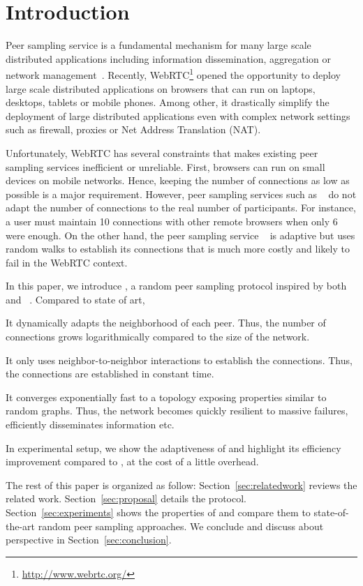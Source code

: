 
\section{Introduction}

Peer sampling service is a fundamental mechanism for many large scale
distributed applications including information dissemination, aggregation
 or network management~\cite{jelasity2007gossip}. Recently,
WebRTC\footnote{\url{http://www.webrtc.org/}} opened the opportunity to deploy large scale distributed
applications on browsers that can run on laptops, desktops, tablets or mobile
phones. Among other, it drastically simplify the deployment of large
distributed applications even with complex network settings such as firewall,
proxies or Net Address Translation (NAT).

Unfortunately, WebRTC has several constraints that makes existing peer
sampling services inefficient or unreliable. First, browsers can run
on small devices on mobile networks. Hence, keeping the number of
connections as low as possible is a major requirement. However, peer
sampling services such as \CYCLON{}~\cite{ voulgaris2005cyclon} do not
adapt the number of connections to the real number of
participants. For instance, a user must maintain 10 connections with
other remote browsers when only 6 were enough. On the other hand, the
peer sampling service \SCAMP{}~\cite{ganesh2003peer} is adaptive but
uses random walks to establish its connections that is much more
costly and likely to fail in the WebRTC context.

In this paper, we introduce \SCAMPLON{}, a random peer sampling protocol
inspired by both \SCAMP{}~\cite{ganesh2003peer} and
\CYCLON{}~\cite{voulgaris2005cyclon}. Compared to state of art,
\begin{inparaenum}[(i)]
\item It dynamically adapts the neighborhood of each peer. Thus, the number of
  connections grows logarithmically compared to the size of the network.
\item It only uses neighbor-to-neighbor interactions to establish the
  connections. Thus, the connections are established in constant time.
\item It converges exponentially fast to a topology exposing properties similar
  to random graphs. Thus, the network becomes quickly resilient to massive
  failures, efficiently disseminates information etc.
\item In experimental setup, we show the adaptiveness of \SCAMPLON{} and
  highlight its efficiency improvement compared to \CYCLON{}, at the cost of a
  little overhead.
\end{inparaenum}

The rest of this paper is organized as follow: Section~\ref{sec:relatedwork}
reviews the related work. Section~\ref{sec:proposal} details the \SCAMPLON{}
protocol.  Section~\ref{sec:experiments} shows the properties of \SCAMPLON{}
and compare them to state-of-the-art random peer sampling approaches. We
conclude and discuss about perspective in Section~\ref{sec:conclusion}.

